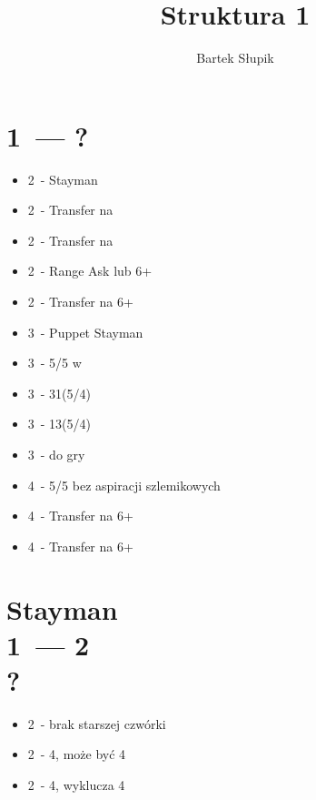 \documentclass[12pt, a4paper]{article}
\title{Struktura 1\nt}
\author{Bartek Słupik}
\begin{document}
    \maketitle
    \section{1\ntx\ --- ?}
    \begin{itemize}
        \item 2\clubs\ - Stayman
        \item 2\diams\ - Transfer na \hearts
        \item 2\hearts\ - Transfer na \spades \br
        \item 2\spades\ - Range Ask lub 6+\clubs
        \item 2\nt\ - Transfer na 6+\diams
        \item 3\clubs\ - Puppet Stayman
        \item 3\diams\ - 5/5 w \minor\ \gf \br
        \item 3\hearts\ - 31(5/4)
        \item 3\spades\ - 13(5/4)
        \item 3\nt\ - do gry \br
        \item 4\clubs\ - 5/5 \major bez aspiracji szlemikowych
        \item 4\diams\ - Transfer na 6+\hearts 
        \item 4\hearts\ - Transfer na 6+\spades
    \end{itemize}
    
    \pagebreak


    \section{Stayman \\ 1\ntx\ --- 2\clubs \\ ?}
    \begin{itemize}
        \item 2\diams\ - brak starszej czwórki
        \item 2\hearts\ - 4\hearts, może być 4\spades
        \item 2\spades\ - 4\spades, wyklucza 4\hearts
    \end{itemize}
\end{document}
